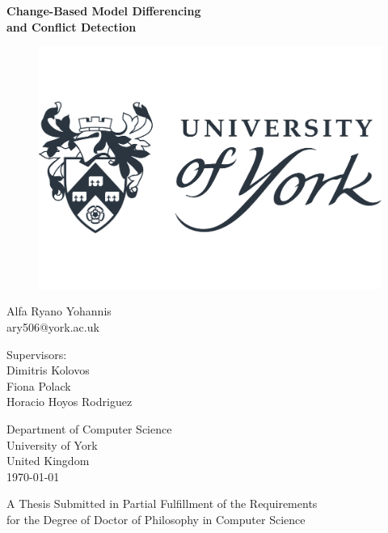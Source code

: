 \documentclass[11pt, a4paper]{report} \usepackage[titletoc]{appendix}
\begin{document}
\begin{titlepage}
\begin{center}

\textbf{\Large Change-Based Model Differencing\\and Conflict Detection}

\vfill
\begin{figure}[ht]
\centering
\includegraphics[width=0.5\linewidth]{uoy}
\label{fig:uoy}
\end{figure}
\vfill

Alfa Ryano Yohannis\\
ary506@york.ac.uk

\vspace{1cm}

Supervisors:\\
Dimitris Kolovos\\
Fiona Polack\\
Horacio Hoyos Rodriguez
\vspace{1cm}

Department of Computer Science\\
University of York\\
United Kingdom\\
\vspace{1cm}
\today

\vfill
A Thesis Submitted in Partial Fulfillment of the Requirements\\
for the Degree of Doctor of Philosophy in Computer Science


\end{center}
\end{titlepage}
\end{document}
